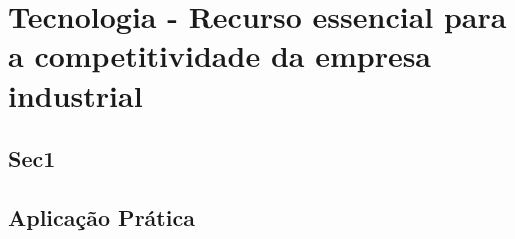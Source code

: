 \chapter{Tecnologia - Recurso essencial para a competitividade da empresa industrial} 
\label{chap:tecnologia_recurso} 

\section{Sec1} 
\label{sec:tecnologia_recurso_sec1} 
 
\section{Aplicação Prática} 
\label{sec:tecnologia_recurso_aplicacao}